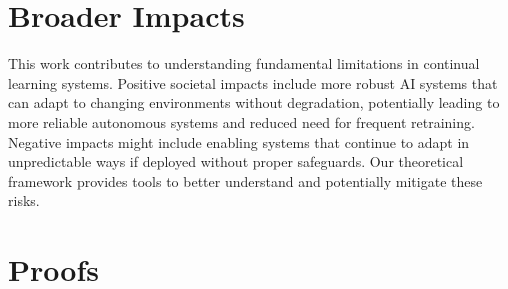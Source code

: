 \documentclass{article}
\begin{document}
\section{Broader Impacts}
This work contributes to understanding fundamental limitations in continual learning systems. Positive societal impacts include more robust AI systems that can adapt to changing environments without degradation, potentially leading to more reliable autonomous systems and reduced need for frequent retraining. Negative impacts might include enabling systems that continue to adapt in unpredictable ways if deployed without proper safeguards. Our theoretical framework provides tools to better understand and potentially mitigate these risks.




\appendix 
\section{Proofs}
\label{app:proofs}
\end{document}
